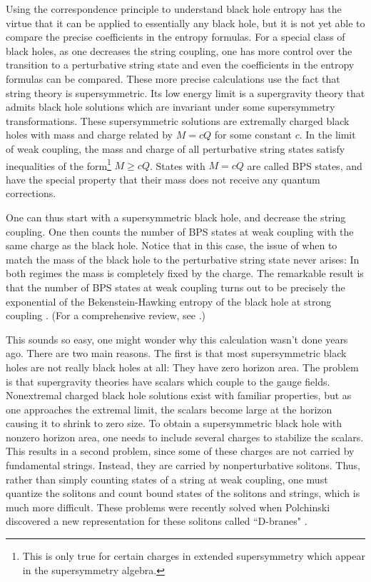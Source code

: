 \documentclass[12pt]{article}
\begin{document}
Using the correspondence principle to understand black hole entropy
has the virtue that it can be applied to 
essentially any black hole, but it is not yet able to compare the
precise coefficients in the entropy formulas. For a special class of
black holes, as one decreases the string coupling,
one  has more control over the transition to a perturbative string
state and even the coefficients in the entropy formulas
can be compared. These more precise calculations use the fact that
string theory is supersymmetric. Its low energy limit is a supergravity
theory that admits black hole solutions  which are invariant under
some supersymmetry transformations. These 
supersymmetric solutions are extremally charged black holes with mass
and charge related by $M=cQ$ for some constant $c$.
In the limit of weak coupling, the mass and charge of
all perturbative string states 
satisfy inequalities of the form\footnote{This is only true for certain
charges in extended supersymmetry which appear in the supersymmetry algebra.}
$M\ge cQ$.
States with $M= cQ$ are called BPS states, and have the special property
that their mass does not receive any quantum corrections.

One can thus start with a supersymmetric black hole, and decrease
the string coupling. One then counts the number of BPS states
at weak coupling with the same charge as the black hole. Notice that
in this case, the issue of when to match the mass of the black hole
to the perturbative string state never arises: In both regimes
the mass is completely fixed by the charge. The remarkable
result is that the number of BPS states at weak coupling
turns out to be precisely the exponential of the Bekenstein-Hawking
entropy of the black hole at strong coupling \cite{stva}. 
(For a comprehensive review, see \cite{malthe}.)

This sounds so easy, one might wonder why this calculation
wasn't done years ago. There are two main reasons. The first is that
most supersymmetric black holes  are not really black holes at all:
They have zero horizon area. The problem is
that supergravity theories have scalars which couple to the gauge fields.
Nonextremal charged black hole solutions exist with familiar properties, but
as one approaches the extremal limit, the scalars become large at the
horizon causing it to shrink to zero size.
To obtain a supersymmetric black hole with nonzero horizon area, one
needs to include several charges to stabilize the scalars. This 
results in a second problem, since some of these
charges are not carried by fundamental strings.  Instead, they
are carried by nonperturbative solitons. Thus, rather than simply counting
states of a string at weak coupling, one must quantize the solitons
and count bound states of the solitons and strings, which is much
more difficult. These problems were recently solved
when
Polchinski discovered a new representation for these solitons called
``D-branes" \cite{pol}. 
\end{document}
